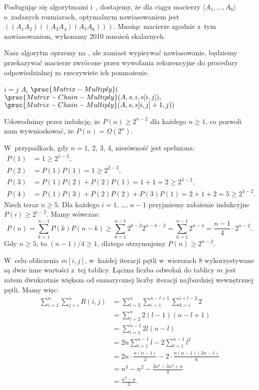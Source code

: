 
\exercise %
Posługując się algorytmami  i~, dostajemy, że dla ciągu macierzy $\langle A_1,\dots,A_6\rangle$ o~zadanych rozmiarach, optymalnym nawiasowaniem jest $((A_1A_2)((A_3A_4)(A_5A_6)))$.
Mnożąc macierze zgodnie z~tym nawiasowaniem, wykonamy 2010 mnożeń skalarnych.

\exercise %
Nasz algorytm oprzemy na , ale zamiast wypisywać nawiasowanie, będziemy przekazywać macierze zwrócone przez wywołania rekurencyjne do procedury odpowiedzialnej za rzeczywiste ich pomnożenie.
\begin{codebox}
\li	\If $i=j$
\li		\Then \Return $A_i$
		\End
\li	\Return $\proc{Matrix-Multiply}($
\zi	\>\>\> $\proc{Matrix-Chain-Multiply}(A,s,i,s[i,j]),$
\zi	\>\>\> $\proc{Matrix-Chain-Multiply}(A,s,s[i,j]+1,j))$
\end{codebox}

\exercise %
Udowodnimy przez indukcję, że $P(n)\ge2^{n-2}$ dla każdego $n\ge1$, co pozwoli nam wywnioskować, że $P(n)=\Omega(2^n)$.

W~przypadkach, gdy $n=1$, 2, 3, 4, nierówność jest spełniona:
\begin{align*}
	P(1) &= 1 \ge 2^{1-2}, \\
	P(2) &= P(1)P(1) = 1 \ge 2^{2-2}, \\
	P(3) &= P(1)P(2)+P(2)P(1) = 1+1 = 2 \ge 2^{3-2}, \\
	P(4) &= P(1)P(3)+P(2)P(2)+P(3)P(1) = 2+1+2 = 5 \ge 2^{4-2}.
\end{align*}
Niech teraz $n\ge5$.
Dla każdego $i=1$, \dots, $n-1$ przyjmiemy założenie indukcyjne $P(i)\ge2^{i-2}$.
Mamy wówczas:
\[
	P(n) = \sum_{k=1}^{n-1}P(k)P(n-k) \ge \sum_{k=1}^{n-1}2^{k-2}2^{n-k-2} = \sum_{k=1}^{n-1}2^{n-4} = \frac{n-1}{4}\cdot2^{n-2}.
\]
Gdy $n\ge5$, to $(n-1)/4\ge1$, dlatego otrzymujemy $P(n)\ge2^{n-2}$.

\exercise %
W~celu obliczenia $m[i,j]$, w~każdej iteracji pętli  w~wierszach 8 wykorzystywane są dwie inne wartości z~tej tablicy.
Łączna liczba odwołań do tablicy $m$ jest zatem dwukrotnie większa od sumarycznej liczby iteracji najbardziej wewnętrznej pętli.
Mamy więc:
\begin{align*}
	\sum_{i=1}^n\sum_{j=i}^nR(i,j) &= \sum_{l=2}^n\sum_{i=1}^{n-l+1}\sum_{k=i}^{i+l-2}2 \\
	&= \sum_{l=2}^n2(l-1)(n-l+1) \\
	&= \sum_{l=1}^{n-1}2l(n-l) \\
	&= 2n\sum_{l=1}^{n-1}l-2\sum_{l=1}^{n-1}l^2 \\
	&= 2n\cdot\frac{n(n-1)}{2}-2\cdot\frac{n(n-1)(2n-1)}{6} \\
	&= n^3-n^2-\frac{2n^3-3n^2+n}{3} \\
	&= \frac{n^3-n}{3}.
\end{align*}

